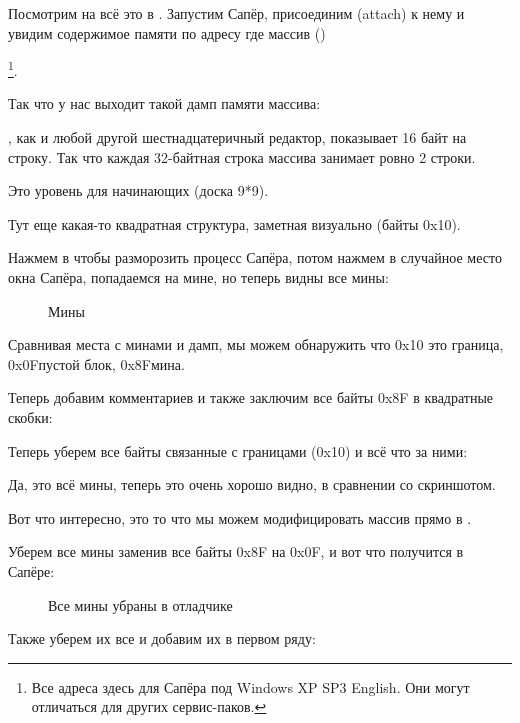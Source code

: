 Посмотрим на всё это в \olly.
Запустим Сапёр, присоединим (attach) \olly к нему и увидим содержимое памяти по адресу где массив  ()%

\footnote{Все адреса здесь для Сапёра под Windows XP SP3 English. 
Они могут отличаться для других сервис-паков.}.

Так что у нас выходит такой дамп памяти массива:



\olly, как и любой другой шестнадцатеричный редактор, показывает 16 байт на строку.
Так что каждая 32-байтная строка массива занимает ровно 2 строки.

Это уровень для начинающих (доска 9*9).

Тут еще какая-то квадратная структура, заметная визуально (байты 0x10).

Нажмем  в \olly чтобы разморозить процесс Сапёра, потом нажмем в случайное место окна Сапёра, попадаемся на мине, но теперь
видны все мины:

\begin{figure}[H]
\centering
{}
\caption{Мины}
\label{fig:minesweeper1}
\end{figure}

Сравнивая места с минами и дамп, мы можем обнаружить что 0x10 это граница, 0x0F\EMDASH{}пустой блок, 
0x8F\EMDASH{}мина.

Теперь добавим комментариев и также заключим все байты 0x8F в квадратные скобки:%



Теперь уберем все байты связанные с границами (0x10) и всё что за ними:%



Да, это всё мины, теперь это очень хорошо видно, в сравнении со скриншотом.

\clearpage
Вот что интересно, это то что мы можем модифицировать массив прямо в \olly.%

Уберем все мины заменив все байты 0x8F на 0x0F, и вот что получится в Сапёре:

\begin{figure}[H]
\centering
{}
\caption{Все мины убраны в отладчике}
\label{fig:minesweeper3}
\end{figure}

Также уберем их все и добавим их в первом ряду: 

